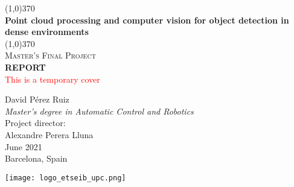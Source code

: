 \documentclass[../main.tex]{subfiles}
\begin{document}
\begin{titlepage}
    \begin{center}
        \vspace*{0cm}
        \line(1,0){370} \\
        [0.5cm]
        \huge{\bfseries Point cloud processing and computer vision for object detection in dense environments} \\
        \line(1,0){370} \\
        [1cm]
        \textsc{\Large Master's Final Project} \\
        [0.2cm]
        \Large \textbf{REPORT} \\
        [0.1cm]
        \textcolor{red}{This is a temporary cover} \\
        [0.5cm]
    \end{center}
    \begin{center}
        \textup{\Large David Pérez Ruiz} \\
        [0.5cm]
        \textit{\large Master's degree in Automatic Control and Robotics} \\
        [0.8cm]
        \textup{\large Project director:} \\
        [0.5cm]
        \textup{\Large Alexandre Perera Lluna} \\
        [0.9cm]
        \textup{\large June 2021} \\
        [0.2cm]
        \textup{\large Barcelona, Spain} \\
        [1.8cm]
    \end{center}
    
    \begin{center}
        \texttt{[image: logo\_etseib\_upc.png]}
    \end{center}
\end{titlepage}
\end{document}

